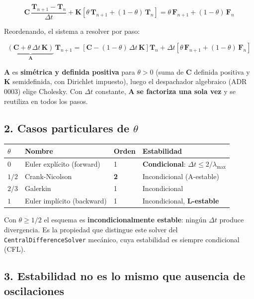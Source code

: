 \documentclass[11pt,letterpaper,oneside]{report}
\begin{document}
\[
\mathbf C\,\frac{\mathbf T_{n+1} - \mathbf T_n}{\Delta t} + \mathbf K\left[\theta\,\mathbf T_{n+1} + (1-\theta)\,\mathbf T_n\right] = \theta\,\mathbf F_{n+1} + (1-\theta)\,\mathbf F_n
\]

Reordenando, el sistema a resolver por paso:

\[
\underbrace{\left(\mathbf C + \theta\,\Delta t\,\mathbf K\right)}_{\mathbf A}\,\mathbf T_{n+1} = \left[\mathbf C - (1-\theta)\,\Delta t\,\mathbf K\right]\mathbf T_n + \Delta t\left[\theta\,\mathbf F_{n+1} + (1-\theta)\,\mathbf F_n\right]
\]

$\mathbf A$ es \textbf{simétrica y definida positiva} para $\theta > 0$ (suma de $\mathbf C$ definida positiva y $\mathbf K$ semidefinida, con Dirichlet impuesto), luego el despachador algebraico (ADR 0003) elige Cholesky. Con $\Delta t$ constante, $\mathbf A$ \textbf{se factoriza una sola vez} y se reutiliza en todos los pasos.

\subsection{2. Casos particulares de \ensuremath{\theta}}

\begin{center}
\begin{tabularx}{\textwidth}{YYYY}
\hline
\textbf{$\theta$} & \textbf{Nombre} & \textbf{Orden} & \textbf{Estabilidad} \\
\hline
$0$ & Euler explícito (forward) & 1 & \textbf{Condicional}: $\Delta t \le 2/\lambda_{\max}$ \\
$1/2$ & Crank-Nicolson & \textbf{2} & Incondicional (A-estable) \\
$2/3$ & Galerkin & 1 & Incondicional \\
$1$ & Euler implícito (backward) & 1 & Incondicional, \textbf{L-estable} \\
\hline
\end{tabularx}
\end{center}
Con $\theta \ge 1/2$ el esquema es \textbf{incondicionalmente estable}: ningún $\Delta t$ produce divergencia. Es la propiedad que distingue este solver del \texttt{CentralDifferenceSolver} mecánico, cuya estabilidad es siempre condicional (CFL).

\subsection{3. Estabilidad no es lo mismo que ausencia de oscilaciones}
\end{document}
